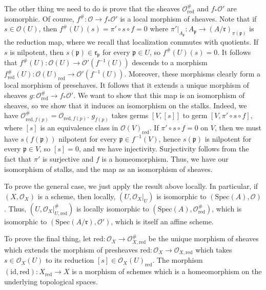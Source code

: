 \documentclass[aps,pra,showpacs,notitlepage,onecolumn,superscriptaddress,nofootinbib]{revtex4-1}
\theoremstyle{definition}
\begin{document}
        The other thing we need to do is prove that the sheaves $\mathcal{O}_{\text{red}}^{\#}$ and $f_{*} \mathcal{O}'$ are isomorphic. Of course, $f^{\#} : \mathcal{O} \rightarrow f_{*} \mathcal{O}'$ is a local morphism
        of sheaves. Note that if $s \in \mathcal{O}(U)$, then $f^{\#}(U)(s) = \pi' \circ s \circ f = 0$ where $\pi'|_{A_{\mathfrak{p}}} : A_{\mathfrak{p}} \rightarrow (A/\mathfrak{r})_{\pi(\mathfrak{p})}$ is the reduction map,
        where we recall that localization commutes with quotients. If $s$ is nilpotent, then $s(\mathfrak{p}) \in \mathfrak{r}_{\mathfrak{p}}$ for every $\mathfrak{p} \in U$, so $f^{\#}(U)(s) = 0$. It follows that
        $f^{\#}(U) : \mathcal{O}(U) \rightarrow \mathcal{O}'(f^{-1}(U))$ descends to a morphism $f^{\#}_{\text{red}}(U) : \mathcal{O}(U)_{\text{red}} \rightarrow \mathcal{O}'(f^{-1}(U))$. Moreover, these morphisms
        clearly form a local morphism of presehaves. It follows that it extends a unique morphism of sheaves $g : \mathcal{O}_{\text{red}}^{\#} \rightarrow f_{*} \mathcal{O}'$. We want to show that
        this map is an isomorphism of sheaves, so we show that it induces an isomorphism on the stalks. Indeed, we have $\mathcal{O}_{\text{red}, f(p)}^{\#} = \mathcal{O}_{\text{red}, f(p)}$. $g_{f(p)}$ takes
        germs $[V, [s]]$ to germ $[V, \pi' \circ s \circ f]$, where $[s]$ is an equivalence class in $\mathcal{O}(V)_{\text{red}}$. If $\pi' \circ s \circ f = 0$ on $V$, then we must have $s(f(\mathfrak{p}))$ nilpotent
        for every $\mathfrak{p} \in f^{-1}(V)$, hence $s(\mathfrak{p})$ is nilpotent for every $\mathfrak{p} \in V$, so $[s] = 0$, and we have injectivity. Surjectivity follows from the fact that $\pi'$ is surjective and
        $f$ is a homeomorphism. Thus, we have our isomorphism of stalks, and the map as an isomorphism of sheaves.

        To prove the general case, we just apply the result above locally. In particular, if $(X, \mathcal{O}_X)$ is a scheme, then locally, $(U, \mathcal{O}_X|_U)$ is isomorphic to $(\text{Spec}(A), \mathcal{O})$. Thus,
        $(U, \mathcal{O}_{X}|_{U, \text{red}}^{\#})$ is locally isomorphic to $(\text{Spec}(A), \mathcal{O}_{\text{red}}^{\#})$, which is isomorphic to $(\text{Spec}(A/\mathfrak{r}), \mathcal{O}')$, which is itself
        an affine scheme.

        To prove the final thing, let $\text{red} : \mathcal{O}_X \rightarrow \mathcal{O}_{X, \text{red}}^{\#}$ be the unique morphism of sheaves which extends the morphism of presheaves
        $\text{red} : \mathcal{O}_X \rightarrow \mathcal{O}_{X, \text{red}}$ which takes $s \in \mathcal{O}_X(U)$ to its reduction $[s] \in \mathcal{O}_X(U)_{\text{red}}$. The morphism
        $(\text{id}, \text{red}) : X_{\text{red}} \rightarrow X$ is a morphism of schemes which is a homeomorphism on the underlying topological spaces.
        \newline
\end{document}
